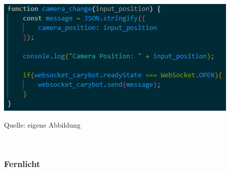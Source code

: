 \documentclass[ngerman,12pt,a4paper]{article}
\begin{document}
	\begin{center}
		\begin{minipage}[t]{0.75\textwidth}
			\includegraphics{Pictures/kamera-js}
			\label{fig:kamera-js}
			\vspace{-10pt}
			\begin{center}
				\par\small Quelle: eigene Abbildung 
			\end{center}
		\end{minipage} \\[0.75cm]
	\end{center}	
				\subsubsection*{Fernlicht}
				
\end{document}
